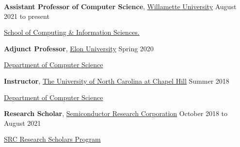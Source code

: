\documentclass[10pt]{article}
\newcommand{\halfblankline}{\quad\vspace{-0.5\baselineskip}\pagebreak[3]}
\begin{document}
\textbf{Assistant Professor of Computer Science},
            \href{https://willamette.edu/}{Willamette University}
            \hfill {August 2021 to present}
\begin{innerlist}

\item[]\href{https://willamette.edu/computing/}{School of Computing \& Information Sciences.}
\end{innerlist}

\halfblankline


\textbf{Adjunct Professor},
            \href{https://www.elon.edu/}{Elon University}
            \hfill {Spring 2020}
\begin{innerlist}
\item[]\href{https://www.elon.edu/u/academics/arts-and-sciences/computer-science/}{Department of Computer Science}

\end{innerlist}

\halfblankline

\textbf{Instructor},
            \href{https://www.unc.edu/}{The University of North Carolina at Chapel Hill}
            \hfill {Summer 2018}
\begin{innerlist}
\item[]\href{https://cs.unc.edu/}{Department of Computer Science}
\end{innerlist}

\halfblankline

\textbf{Research Scholar},
            \href{https://www.src.org/}{Semiconductor Research Corporation}
            \hfill {October 2018 to August 2021}
\begin{innerlist}
    \item[] \href{https://www.src.org/student-center/}{SRC Research Scholars Program}
\end{innerlist}

\halfblankline
\end{document}
